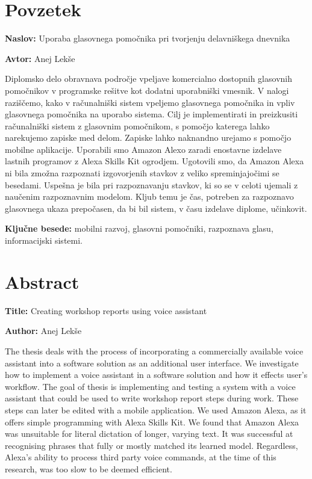 \documentclass[a4paper, 12pt]{book}
\newcommand{\ttitle}{Uporaba glasovnega pomočnika pri tvorjenju delavniškega dnevnika}
\newcommand{\ttitleEn}{Creating workshop reports using voice assistant}
\newcommand{\tauthor}{Anej Lekše}
\newcommand{\tkeywords}{mobilni razvoj, glasovni pomočniki, razpoznava glasu, informacijski sistemi}
\newcommand{\clearemptydoublepage}{\newpage{\pagestyle{empty}\cleardoublepage}}
\begin{document}
\chapter*{Povzetek}

\noindent\textbf{Naslov:} \ttitle
\bigskip

\noindent\textbf{Avtor:} \tauthor
\bigskip


\noindent Diplomsko delo obravnava področje vpeljave komercialno dostopnih glasovnih pomočnikov v programske rešitve kot dodatni uporabniški vmesnik.
V nalogi raziščemo, kako v računalniški sistem vpeljemo glasovnega pomočnika in vpliv glasovnega pomočnika na uporabo sistema.
Cilj je implementirati in preizkusiti računalniški sistem z glasovnim pomočnikom, s pomočjo katerega lahko narekujemo zapiske med delom. 
Zapiske lahko naknandno urejamo s pomočjo mobilne aplikacije.
Uporabili smo Amazon Alexo zaradi enostavne izdelave lastnih programov z Alexa Skills Kit ogrodjem.
Ugotovili smo, da Amazon Alexa ni bila zmožna razpoznati izgovorjenih stavkov z veliko spreminjajočimi se besedami.
Uspešna je bila pri razpoznavanju stavkov, ki so se v celoti ujemali z naučenim razpoznavnim modelom.
Kljub temu je čas, potreben za razpoznavo glasovnega ukaza prepočasen, da bi bil sistem, v času izdelave diplome, učinkovit.
\bigskip

\noindent\textbf{Ključne besede:} \tkeywords.
\clearemptydoublepage

\chapter*{Abstract}

\noindent\textbf{Title:} \ttitleEn
\bigskip

\noindent\textbf{Author:} \tauthor
\bigskip

\noindent The thesis deals with the process of incorporating a commercially available voice assistant into a software solution as an additional user interface.
We investigate how to implement a voice assistant in a software solution and how it effects user's workflow.
The goal of thesis is implementing and testing a system with a voice assistant that could be used to write workshop report steps during work.
These steps can later be edited with a mobile application.
We used Amazon Alexa, as it offers simple programming with Alexa Skills Kit.
We found that Amazon Alexa was unsuitable for literal dictation of longer, varying text.
It was successful at recognising phrases that fully or mostly matched its learned model.
Regardless, Alexa's ability to process third party voice commands, at the time of this research, was too slow to be deemed efficient.
\end{document}
